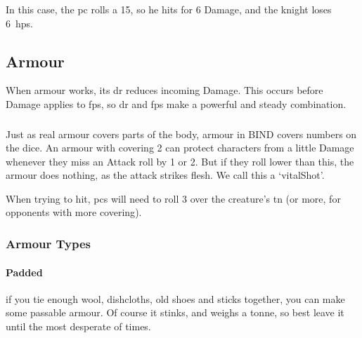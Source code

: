 \begin{multicols}{2}
{  In this case, the \gls{pc} rolls a 15, so he hits for 6 Damage, and the knight loses 6~\glspl{hp}.

}{

}

\subsection{Armour}



When armour works, its \gls{dr} reduces incoming Damage.
This occurs before Damage applies to \glspl{fp}, so \gls{dr} and \glspl{fp} make a powerful and steady combination.

\subsubsection{}
\label{vitals}
Just as real armour covers parts of the body, armour in BIND covers numbers on the dice.
An armour with \gls{covering} 2 can protect characters from a little Damage whenever they miss an Attack roll by 1 or 2.
But if they roll lower than this, the armour does nothing, as the attack strikes flesh.
We call this a `\gls{vitalShot}'.

When trying to hit, \glspl{pc} will need to roll 3 over the creature's \gls{tn} (or more, for opponents with more \gls{covering}).

\armourchart

\noindent
\subsubsection{Armour Types}

\paragraph{Padded}
if you tie enough wool, dishcloths, old shoes and sticks together, you can make some passable armour.
Of course it stinks, and weighs a tonne, so best leave it until the most desperate of times.


\end{multicols}
